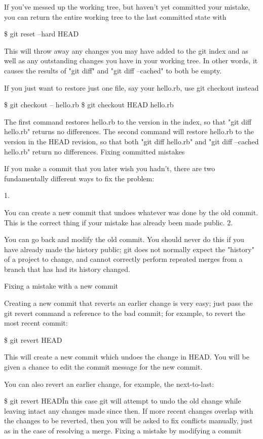 \documentclass[a4paper,10pt]{article}
\begin{document}
If you've messed up the working tree, but haven't yet committed your mistake, you can return the entire working tree to the last committed state with

\$ git reset --hard HEAD

This will throw away any changes you may have added to the git index and as well as any outstanding changes you have in your working tree. In other words, it causes the results of "git diff" and "git diff --cached" to both be empty.

If you just want to restore just one file, say your hello.rb, use git checkout instead

\$ git checkout -- hello.rb
\$ git checkout HEAD hello.rb

The first command restores hello.rb to the version in the index, so that "git diff hello.rb" returns no differences. The second command will restore hello.rb to the version in the HEAD revision, so that both "git diff hello.rb" and "git diff --cached hello.rb" return no differences.
Fixing committed mistakes

If you make a commit that you later wish you hadn't, there are two fundamentally different ways to fix the problem:

1.

You can create a new commit that undoes whatever was done by the old commit. This is the correct thing if your mistake has already been made public.
2.

You can go back and modify the old commit. You should never do this if you have already made the history public; git does not normally expect the "history" of a project to change, and cannot correctly perform repeated merges from a branch that has had its history changed.

Fixing a mistake with a new commit

Creating a new commit that reverts an earlier change is very easy; just pass the git revert command a reference to the bad commit; for example, to revert the most recent commit:

\$ git revert HEAD

This will create a new commit which undoes the change in HEAD. You will be given a chance to edit the commit message for the new commit.

You can also revert an earlier change, for example, the next-to-last:

\$ git revert HEAD\^
In this case git will attempt to undo the old change while leaving intact any changes made since then. If more recent changes overlap with the changes to be reverted, then you will be asked to fix conflicts manually, just as in the case of resolving a merge.
Fixing a mistake by modifying a commit
\end{document}
